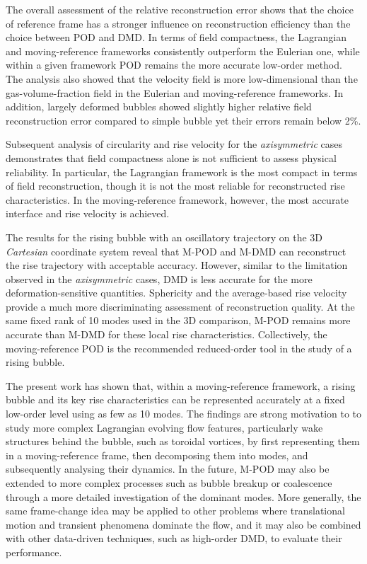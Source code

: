 \documentclass[a4paper,fleqn]{cas-sc}
\begin{document}
	The overall assessment of the relative reconstruction error shows that the choice of reference frame has a stronger influence on reconstruction efficiency than the choice between POD and DMD. In terms of field compactness, the Lagrangian and moving-reference frameworks consistently outperform the Eulerian one, while within a given framework POD remains the more accurate low-order method. The analysis also showed that the velocity field is more low-dimensional than the gas-volume-fraction field in the Eulerian and moving-reference frameworks. In addition, largely deformed bubbles showed slightly higher relative field reconstruction error compared to simple bubble yet their errors remain below 2\%. 
	
	Subsequent analysis of circularity and rise velocity for the \textit{axisymmetric} cases demonstrates that field compactness alone is not sufficient to assess physical reliability. In particular, the Lagrangian framework is the most compact in terms of field reconstruction, though it is not the most reliable for reconstructed rise characteristics. In the moving-reference framework, however, the most accurate interface and rise velocity is achieved. 
	
	The results for the rising bubble with an oscillatory trajectory on the 3D \textit{Cartesian} coordinate system reveal that M-POD and M-DMD can reconstruct the rise trajectory with acceptable accuracy. However, similar to the limitation observed in the \textit{axisymmetric} cases, DMD is less accurate for the more deformation-sensitive quantities. Sphericity and the average-based rise velocity provide a much more discriminating assessment of reconstruction quality. At the same fixed rank of 10 modes used in the 3D comparison, M-POD remains more accurate than M-DMD for these local rise characteristics. Collectively, the moving-reference POD is the recommended reduced-order tool in the study of a rising bubble.
	
	The present work has shown that, within a moving-reference framework, a rising bubble and its key rise characteristics can be represented accurately at a fixed low-order level using as few as 10 modes. The findings are strong motivation to to study more complex Lagrangian evolving flow features, particularly wake structures behind the bubble, such as toroidal vortices, by first representing them in a moving-reference frame, then decomposing them into modes, and subsequently analysing their dynamics. In the future, M-POD may also be extended to more complex processes such as bubble breakup or coalescence through a more detailed investigation of the dominant modes. More generally, the same frame-change idea may be applied to other problems where translational motion and transient phenomena dominate the flow, and it may also be combined with other data-driven techniques, such as high-order DMD, to evaluate their performance. \\
	
\end{document}
